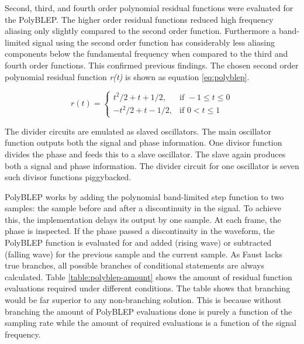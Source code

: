 \documentclass[11pt,a4paper]{article}
\begin{document}
Second, third, and fourth order polynomial residual functions were evaluated for the PolyBLEP. The higher order residual functions reduced high frequency aliasing only slightly compared to the second order function. Furthermore a band-limited signal using the second order function has considerably less aliasing components below the fundamental frequency when compared to the third and fourth order functions. This confirmed previous findings\cite{pekonen}. The chosen second order polynomial residual function \emph{r(t)} is shown as equation \ref{eq:polyblep}.

\begin{equation}
\label{eq:polyblep}
r(t) = \begin{cases} 	t^2/2  + t + 1/2, & \mbox{if } -1 \leq t \leq 0\\ 
			-t^2/2 + t - 1/2, & \mbox{if } 0 < t \leq 1 \end{cases}
\end{equation}

The divider circuits are emulated as slaved oscillators. The main oscillator function outputs both the signal and phase information. One divisor function divides the phase and feeds this to a slave oscillator. The slave again produces both a signal and phase information. The divider circuit for one oscillator is seven such divisor functions piggybacked.

PolyBLEP works by adding the polynomial band-limited step function to two samples: the sample before and after a discontinuity in the signal. To achieve this, the implementation delays its output by one sample. At each frame, the phase is inspected. If the phase passed a discontinuity in the waveform, the PolyBLEP function is evaluated for and added (rising wave) or subtracted (falling wave) for the previous sample and the current sample. As Faust lacks true branches, all possible branches of conditional statements are always calculated. Table \ref{table:polyblep-amount} shows the amount of residual function evaluations required under different conditions. The table shows that branching would be far superior to any non-branching solution. This is because without branching the amount of PolyBLEP evaluations done is purely a function of the sampling rate while the amount of required evaluations is a function of the signal frequency. 
\end{document}
